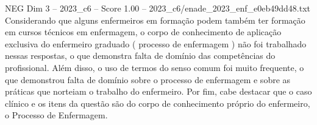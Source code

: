 \begin{textsample}{NEG Dim 3 – 2023\_c6 – Score 1.00 – 2023\_c6/enade\_2023\_enf\_e0eb49dd48.txt}
Considerando que alguns enfermeiros em formação podem também ter formação em cursos técnicos em enfermagem, o corpo de conhecimento de aplicação exclusiva do enfermeiro graduado ( processo de enfermagem ) não foi trabalhado nessas respostas, o que demonstra falta de domínio das competências do profissional.
Além disso, o uso de termos do senso comum foi muito frequente, o que demonstrou falta de domínio sobre o processo de enfermagem e sobre as práticas que norteiam o trabalho do enfermeiro.
Por fim, cabe destacar que o caso clínico e os itens da questão são do corpo de conhecimento próprio do enfermeiro, o Processo de Enfermagem.

\end{textsample}
